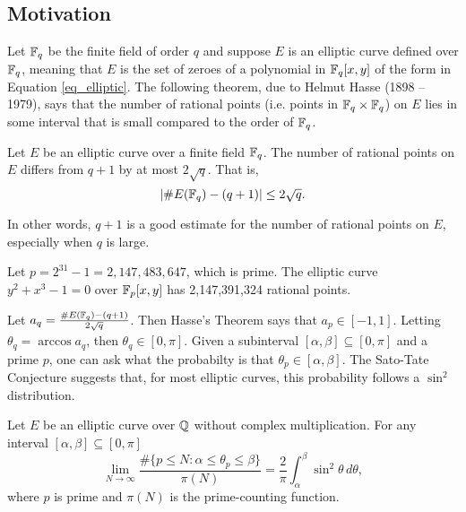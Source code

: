 
\subsection{Motivation}

Let $\mathbb{F}_q$ be the finite field of order $q$ and suppose $E$ is an elliptic curve defined over $\mathbb{F}_q$,
meaning that $E$ is the set of zeroes of a polynomial in $\mathbb{F}_q[x,y]$ of the form in Equation \ref{eq_elliptic}.
The following theorem, due to Helmut Hasse (1898 -- 1979), says that
the number of rational points (i.e. points in $\mathbb{F}_q \times \mathbb{F}_q$) on $E$
lies in some interval that is small compared to the order of $\mathbb{F}_q$.
\begin{theorem}[Hasse]
  Let $E$ be an elliptic curve over a finite field $\mathbb{F}_q$.
  The number of rational points on $E$ differs from $q + 1$ by at most $2 \sqrt q$. That is,
  \[ | \#E(\mathbb{F}_q) - (q + 1) | \leq 2 \sqrt q. \]
\end{theorem}
In other words,
$q + 1$ is a good estimate for the number of rational points on $E$,
especially when $q$ is large.

\begin{example}
  Let $p = 2^{31} - 1 = 2,147,483,647$, which is prime.
  The elliptic curve $y^2 + x^3 - 1 = 0$ over $\mathbb{F}_p[x,y]$ has 2,147,391,324 rational points.
\end{example}

Let $a_q = \frac {\#E(\mathbb{F}_q) - (q + 1)} {2\sqrt q}$.
Then Hasse's Theorem says that $a_p \in [-1, 1]$.
Letting $\theta_q = \arccos a_q$, then $\theta_q \in [0, \pi]$.
Given a subinterval $[\alpha, \beta] \subseteq [0, \pi]$ and a prime $p$,
one can ask what the probabilty is that $\theta_p \in [\alpha, \beta]$.
The Sato-Tate Conjecture suggests that, for most elliptic curves, this probability follows a $\sin^2$ distribution.

\begin{conjecture}
  Let $E$ be an elliptic curve over $\mathbb{Q}$ without complex multiplication.
  For any interval $[\alpha, \beta] \subseteq [0, \pi]$
  \[ \lim_{N \to \infty}
    \frac {\#\{ p \leq N : \alpha \leq \theta_p \leq \beta \}} {\pi(N)} =
    \frac 2 \pi \int_{\alpha}^{\beta} \sin^2 \theta\,d\theta, \]
  where $p$ is prime and $\pi(N)$ is the prime-counting function.
\end{conjecture}

